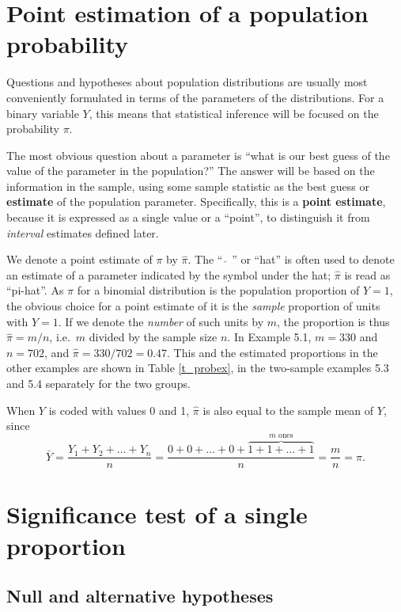 \section{Point estimation of a population probability}
\label{s_probs_pointest}

Questions and hypotheses about population distributions are usually most
conveniently formulated in terms of the parameters of the distributions.
For a binary variable $Y$, this means that statistical inference will be
focused on the probability $\pi$.

The most obvious question about a parameter is ``what is our
best guess of the value of the parameter in the population?'' The answer
will be based on the information in the sample, using some sample
statistic as the best guess or \textbf{estimate} of the population
parameter. Specifically, this is a \textbf{point estimate}, because it
is expressed as a single value or a ``point'', to distinguish it from
\emph{interval} estimates defined later.

We denote a point estimate of $\pi$ by $\hat{\pi}$. The ``$\; \hat{\;}
\; $'' or ``hat'' is often used to denote an estimate of a
parameter indicated by the symbol under the hat; $\hat{\pi}$ is read as
``pi-hat''. As $\pi$ for a binomial distribution is the population
proportion of $Y=1$, the obvious choice for a point estimate of it is
the \emph{sample} proportion of units with $Y=1$. If we denote the
\emph{number} of such units by $m$, the proportion is thus
$\hat{\pi}=m/n$, i.e.\ $m$ divided by the sample size $n$. In Example
5.1, $m=330$ and $n=702$, and $\hat{\pi}=330/702=0.47$. This and the
estimated proportions in the other examples are shown in Table
\ref{t_probex}, in the two-sample examples 5.3 and 5.4 separately for
the two groups.

When $Y$ is coded with values 0 and 1, $\hat{\pi}$ is also equal to the
sample mean of $Y$, since
\begin{equation}
\bar{Y}=\frac{Y_{1}+Y_{2}+\dots+Y_{n}}{n}=
\frac{0+0+\dots+0+\overbrace{1+1+\dots+1}^{m \text{ ones}}}{n}=
\frac{m}{n}=\hat{\pi}.
\label{pihat_as_ybar}
\end{equation}

\section{Significance test of a single proportion}
\label{s_probs_test1sample}

\subsection{Null and alternative hypotheses}
\label{ss_probs_test1sample_hypotheses}

